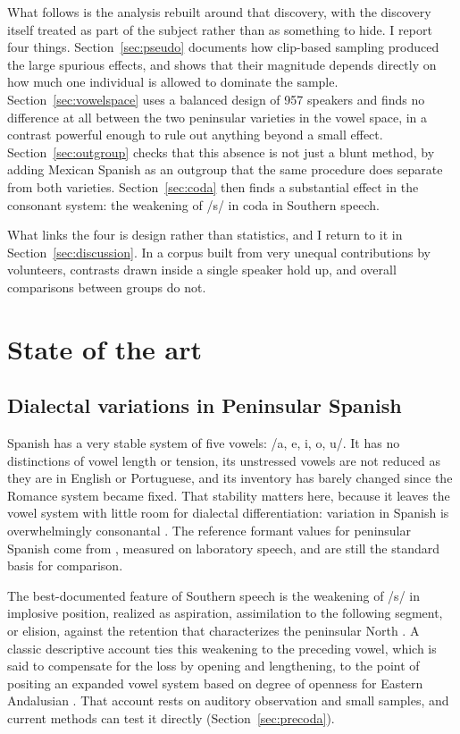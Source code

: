 \documentclass[11pt]{article}
\begin{document}
What follows is the analysis rebuilt around that discovery, with the discovery
itself treated as part of the subject rather than as something to hide. I report
four things. Section~\ref{sec:pseudo} documents how clip-based sampling produced
the large spurious effects, and shows that their magnitude depends directly on
how much one individual is allowed to dominate the sample.
Section~\ref{sec:vowelspace} uses a balanced design of 957 speakers and finds no
difference at all between the two peninsular varieties in the vowel space, in a
contrast powerful enough to rule out anything beyond a small effect.
Section~\ref{sec:outgroup} checks that this absence is not just a blunt method,
by adding Mexican Spanish as an outgroup that the same procedure does separate
from both varieties. Section~\ref{sec:coda} then finds a substantial effect in
the consonant system: the weakening of /s/ in coda in Southern speech.

What links the four is design rather than statistics, and I return to it in
Section~\ref{sec:discussion}. In a corpus built from very unequal contributions
by volunteers, contrasts drawn inside a single speaker hold up, and overall
comparisons between groups do not.

\section{State of the art}

\subsection{Dialectal variations in Peninsular Spanish}
\label{sec:dialectal}

Spanish has a very stable system of five vowels: /a, e, i, o, u/. It has no
distinctions of vowel length or tension, its unstressed vowels are not reduced as
they are in English or Portuguese, and its inventory has barely changed since the
Romance system became fixed. That stability matters here, because it leaves the
vowel system with little room for dialectal differentiation: variation in Spanish
is overwhelmingly consonantal \citep{hualde2005,martinez2007}. The reference
formant values for peninsular Spanish come from \citet{quilis1981}, measured on
laboratory speech, and are still the standard basis for comparison.

The best-documented feature of Southern speech is the weakening of /s/ in
implosive position, realized as aspiration, assimilation to the following
segment, or elision, against the retention that characterizes the peninsular
North \citep{alvar1996,narbona1998,gerfen2002,ruch2014}. A classic descriptive
account ties this weakening to the preceding vowel, which is said to compensate
for the loss by opening and lengthening, to the point of positing an expanded
vowel system based on degree of openness for Eastern Andalusian
\citep{alonso1950}. That account rests on auditory observation and small samples,
and current methods can test it directly (Section~\ref{sec:precoda}).
\end{document}
